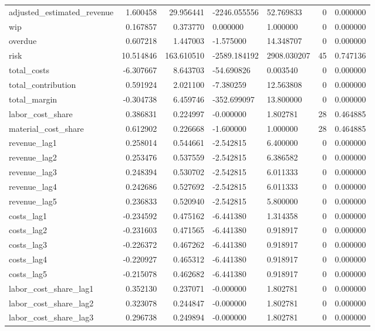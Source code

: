 \begin{landscape}
\begin{longtable}[h!]{lrrllrr}
adjusted_estimated_revenue & 1.600458 & 29.956441 & -2246.055556 & 52.769833 & 0 & 0.000000 \\
wip & 0.167857 & 0.373770 & 0.000000 & 1.000000 & 0 & 0.000000 \\
overdue & 0.607218 & 1.447003 & -1.575000 & 14.348707 & 0 & 0.000000 \\
risk & 10.514846 & 163.610510 & -2589.184192 & 2908.030207 & 45 & 0.747136 \\
total_costs & -6.307667 & 8.643703 & -54.690826 & 0.003540 & 0 & 0.000000 \\
total_contribution & 0.591924 & 2.021100 & -7.380259 & 12.563808 & 0 & 0.000000 \\
total_margin & -0.304738 & 6.459746 & -352.699097 & 13.800000 & 0 & 0.000000 \\
labor_cost_share & 0.386831 & 0.224997 & -0.000000 & 1.802781 & 28 & 0.464885 \\
material_cost_share & 0.612902 & 0.226668 & -1.600000 & 1.000000 & 28 & 0.464885 \\
revenue_lag1 & 0.258014 & 0.544661 & -2.542815 & 6.400000 & 0 & 0.000000 \\
revenue_lag2 & 0.253476 & 0.537559 & -2.542815 & 6.386582 & 0 & 0.000000 \\
revenue_lag3 & 0.248394 & 0.530702 & -2.542815 & 6.011333 & 0 & 0.000000 \\
revenue_lag4 & 0.242686 & 0.527692 & -2.542815 & 6.011333 & 0 & 0.000000 \\
revenue_lag5 & 0.236833 & 0.520940 & -2.542815 & 5.800000 & 0 & 0.000000 \\
costs_lag1 & -0.234592 & 0.475162 & -6.441380 & 1.314358 & 0 & 0.000000 \\
costs_lag2 & -0.231603 & 0.471565 & -6.441380 & 0.918917 & 0 & 0.000000 \\
costs_lag3 & -0.226372 & 0.467262 & -6.441380 & 0.918917 & 0 & 0.000000 \\
costs_lag4 & -0.220927 & 0.465312 & -6.441380 & 0.918917 & 0 & 0.000000 \\
costs_lag5 & -0.215078 & 0.462682 & -6.441380 & 0.918917 & 0 & 0.000000 \\
labor_cost_share_lag1 & 0.352130 & 0.237071 & -0.000000 & 1.802781 & 0 & 0.000000 \\
labor_cost_share_lag2 & 0.323078 & 0.244847 & -0.000000 & 1.802781 & 0 & 0.000000 \\
labor_cost_share_lag3 & 0.296738 & 0.249894 & -0.000000 & 1.802781 & 0 & 0.000000 \\

\end{longtable}
\end{landscape}
